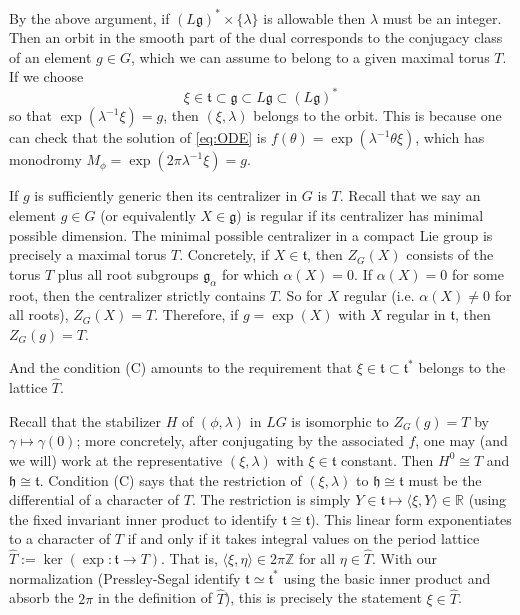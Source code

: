 \documentclass[12pt]{article}
\begin{document}
By the above argument, if $(L\mathfrak{g})^* \times \{\lambda\}$ is allowable then $\lambda$ must be an integer. Then an orbit in the smooth part of the dual corresponds to the
conjugacy class of an element $g \in G$, which we can assume to belong to a given
maximal torus $T$. If we choose
\[
    \xi \in \mathfrak{t} \subset \mathfrak{g} \subset L\mathfrak{g} \subset (L\mathfrak{g})^*
\]
so that $\exp(\lambda^{-1}\xi) = g$, then $(\xi,\lambda)$ belongs to the orbit. This is because one can check that the solution of \eqref{eq:ODE} is $f(\theta) = \exp(\lambda^{-1}\theta \xi)$, which has monodromy $M_\phi = \exp(2\pi \lambda^{-1}\xi) = g$.



If $g$ is sufficiently generic then its centralizer in $G$ is $T$. Recall that we say an element $g \in G$ (or equivalently $X \in \mathfrak{g}$) is regular if its centralizer has minimal possible dimension. The minimal possible centralizer in a compact Lie group is precisely a maximal torus $T$. Concretely, if $X \in \mathfrak{t}$, then $Z_G(X)$ consists of the torus $T$ plus all root subgroups $\mathfrak{g}_\alpha$ for which $\alpha(X)=0$. If $\alpha(X)=0$ for some root, then the centralizer strictly contains $T$. So for $X$ regular (i.e. $\alpha(X)\neq 0$ for all roots), $Z_G(X)=T$. Therefore, if $g=\exp(X)$ with $X$ regular in $\mathfrak{t}$, then $Z_G(g) = T$.

And the condition (C) amounts to the requirement that $\xi \in \mathfrak{t} \subset \mathfrak{t}^*$ belongs to the lattice $\hat{T}$.

Recall that the stabilizer $H$ of $(\phi,\lambda)$ in $LG$ is isomorphic to $Z_G(g)=T$ by $\gamma\mapsto \gamma(0)$; more concretely, after conjugating by the associated $f$, one may (and we will) work at the representative $(\xi,\lambda)$ with $\xi\in\mathfrak{t}$ constant. Then $H^0 \cong T$ and $\mathfrak{h} \cong \mathfrak{t}$. Condition (C) says that the restriction of $(\xi,\lambda)$ to $\mathfrak{h}\cong\mathfrak{t}$ must be the differential of a character of $T$. The restriction is simply $Y\in\mathfrak{t} \mapsto \langle \xi,Y\rangle\in\mathbb{R}$ (using the fixed invariant inner product to identify $\mathfrak{t}\cong\mathfrak{t}$). This linear form exponentiates to a character of $T$ if and only if it takes integral values on the period lattice $\widehat{T}:=\ker(\exp: \mathfrak{t} \to T)$. That is, $\langle \xi,\eta\rangle \in 2\pi\mathbb{Z}$ for all $\eta\in \widehat{T}$. With our normalization (Pressley-Segal identify $\mathfrak{t}\simeq \mathfrak{t}^*$ using the basic inner product and absorb the $2\pi$ in the definition of $\widehat{T}$), this is precisely the statement $\xi \in \widehat{T}$.
\end{document}

